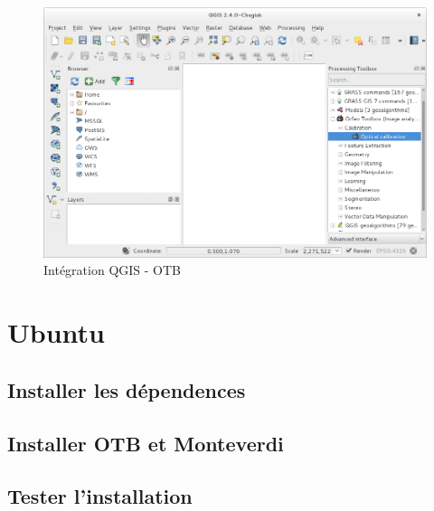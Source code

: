 \documentclass[10pt,a4paper]{article}
\begin{document}
\begin{figure}[h]
  \center
  \includegraphics[width=1\textwidth]{Art/qgis-otb.png}
  \caption[]{Intégration QGIS - OTB}
  \label{fig:otb-qgis}
\end{figure}

\clearpage
\section{Ubuntu}

\subsection{Installer les dépendences}

\subsection{Installer OTB et Monteverdi}

\subsection{Tester l'installation}
\end{document}
